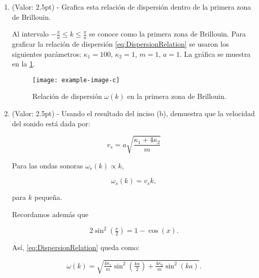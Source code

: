 \documentclass[./../main.tex]{subfiles}
\begin{document}
\begin{enumerate}
            \item (Valor: 2.5pt) - Grafica esta relación de dispersión dentro de la primera zona de Brillouin.
            
            \startsolution[print]
            
                Al intervalo \(-\tfrac{\pi}{a} \leq k \leq \tfrac{\pi}{a}\) se conoce como la primera zona de Brillouin. Para graficar la relación de dispersión \cref{eq:DispersionRelation} se usaron los siguientes parámetros: \(\kappa_{1} = 100\), \(\kappa_{2} = 1\), \(m = 1\), \(a = 1\). La gráfica se muestra en la \cref{fig:DispersionRelationPlot}.

                \begin{figure}[htb]
                    \centering
                    \texttt{[image: example-image-c]}
                    \caption{Relación de dispersión \(\omega(k)\) en la primera zona de Brillouin.}
                    \label{fig:DispersionRelationPlot}
                \end{figure}
            
            \pagebreak
            \item (Valor: 2.5pt) - Usando el resultado del inciso (b), demuestra que la velocidad del sonido está dada por:
            
            \begin{equation*}
                v_{s} = a\sqrt{\dfrac{\kappa_{1} + 4\kappa_{2}}{m}}
            \end{equation*}

                \startsolution[print]

                Para las ondas sonoras \(\omega_{s}(k) \propto k\),

                \begin{equation*}
                    \omega_{s}(k) = v_{s}k,
                \end{equation*}

                para \(k\) pequeña.

                Recordamos además que
                
                \begin{equation*}
                    2\sin^{2}\left(\tfrac{x}{2}\right) = 1 - \cos(x).
                \end{equation*}

                Así, \cref{eq:DispersionRelation} queda como:

                \begin{equation*}
                    \omega(k) = \sqrt{\tfrac{4\kappa_{1}}{m}\sin^{2}\left(\tfrac{ka}{2}\right) + \tfrac{4\kappa_{2}}{m}\sin^{2}\left(ka\right)}.
                \end{equation*}


\end{enumerate}
\end{document}
